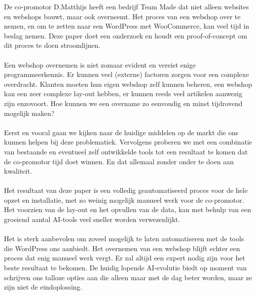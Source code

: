 De co-promotor D.Matthijs heeft een bedrijf Team Made dat niet alleen websites en webshops bouwt, maar ook overneemt. Het proces van een webshop over te nemen, en om te zetten naar een WordPress met WooCommerce, kan veel tijd in beslag nemen. Deze paper doet een onderzoek en houdt een proof-of-concept om dit proces te doen stroomlijnen.
\\\\
Een webshop overnemen is niet zomaar evident en vereist enige programmeerkennis. Er kunnen veel (externe) factoren zorgen voor een complexe overdracht. Klanten moeten hun eigen webshop zelf kunnen beheren, een webshop kan een zeer complexe lay-out hebben, er kunnen reeds veel artikelen aanwezig zijn enzovoort. Hoe kunnen we een overname zo eenvoudig en minst tijdrovend mogelijk maken?
\\\\
Eerst en vooral gaan we kijken naar de huidige middelen op de markt die ons kunnen helpen bij deze problematiek. Vervolgens proberen we met een combinatie van bestaande en eventueel zelf ontwikkelde tools tot een resultaat te komen dat de co-promotor tijd doet winnen. En dat allemaal zonder onder te doen aan kwaliteit. 
\\\\
Het resultaat van deze paper is een volledig geautomatiseerd proces voor de hele opzet en installatie, met zo weinig mogelijk manueel werk voor de co-promotor. Het voorzien van de lay-out en het opvullen van de data, kan met behulp van een groeiend aantal AI-tools veel sneller worden verwezenlijkt.
\\\\
Het is sterk aanbevolen om zoveel mogelijk te laten automatiseren met de tools die WordPress ons aanbiedt. Het overnemen van een webshop blijft echter een proces dat enig manueel werk vergt. Er zal altijd een expert nodig zijn voor het beste resultaat te bekomen. De huidig lopende AI-evolutie biedt op moment van schrijven ons talloze opties aan die alleen maar met de dag beter worden, maar ze zijn niet de eindoplossing.


